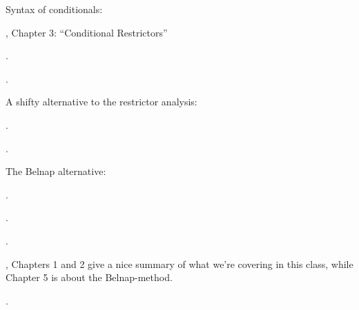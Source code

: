 {Syntax of conditionals:
\begin{bibentrylist}
  \item {}, Chapter 3: ``Conditional Restrictors''
  \item {}.
	\item {}.
\end{bibentrylist}

A shifty alternative to the restrictor analysis:

\begin{bibentrylist}
  \item {}.
  \item {}.
\end{bibentrylist}

The Belnap alternative:

\begin{bibentrylist}
   \item {}.
   \item {}.
   \item {}.
   \item {}, Chapters 1 and 2 give a nice summary of what we're covering in this class, while Chapter 5 is about the Belnap-method.
   \item {}.
\end{bibentrylist}
  
}


